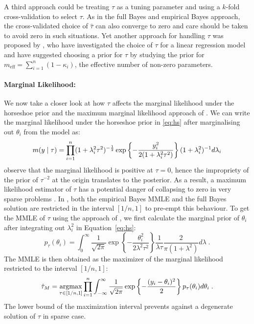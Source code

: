 \documentclass[11pt]{article}
\begin{document}
A third approach could be treating $\tau$ as a tuning parameter and using a
$k$-fold cross-validation to select $\tau$.  As in the full Bayes and empirical
Bayes approach, the cross-validated choice of $\hat{\tau}$ can also converge to
zero and care should be taken to avoid zero in such situations. Yet another
approach for handling $\tau$ was proposed by \citet{piironen2016hyperprior},
who have investigated the choice of $\tau$ for a linear regression model and
have suggested choosing a prior for $\tau$ by studying the prior for
$m_{\text{eff}} = \sum_{i=1}^{n} (1-\kappa_i)$, the effective number of
non-zero parameters. 


\paragraph{Marginal Likelihood: } We now take a closer look at how $\tau$
affects the marginal likelihood under the horseshoe prior and the maximum
marginal likelihood approach of \cite{van2017adaptive}. 
We can write the marginal likelihood under the horseshoe prior in \eqref{eq:hs}
after marginalising out $\theta_i$ from the model as:
\begin{equation}
  m(y \mid \tau) = \prod_{i=1}^{n} (1+\lambda_i^2 \tau^2)^{-\frac{1}{2}} \exp \left
  \{ - \frac{y_i^2}{2(1+\lambda_i^2 \tau^2)} \right \}  (1+\lambda_i^2)^{-1} d
  \lambda_i 
\end{equation}
\citet{tiao1965bayesian} observe that the marginal likelihood is positive at 
$\tau = 0$, hence the impropriety of the prior of $\tau^{-2}$ at the origin
translates to the posterior. As a result, a maximum likelihood estimator of
$\tau$ has a potential danger of collapsing to zero in very sparse problems
\citep{polson2010shrink, datta2013asymptotic}. In \cite{van2017adaptive}, 
both the empirical Bayes MMLE and the full Bayes solution are
restricted in the interval $[1/n,1]$ to pre-empt this behaviour. To get the
MMLE of $\tau$ using the approach of \cite{van2017adaptive}, we first calculate the
marginal prior of $\theta_i$ after integrating out $\lambda_i^2$ in 
Equation~\eqref{eq:hs}:
\begin{equation}
  p_{\tau}(\theta_i) = \int_{0}^{\infty} \frac{1}{\sqrt{2 \pi}} \exp \left\{ -
  \frac{\theta_i^2}{2\lambda^2 \tau^2} \right\} \frac{1}{\lambda \tau}
  \frac{2}{\pi(1+\lambda^2)} d\lambda
  \;.
\end{equation}
The MMLE is then obtained as the maximizer of the marginal likelihood
restricted to the interval $[1/n,1]$: 
\begin{equation}
  \hat{\tau}_M = \argmax_{\tau \in [1/n,1]} \prod_{i=1}^{n}
  \int_{-\infty}^{\infty} \frac{1}{\sqrt{2 \pi}} \exp \left\{ - \frac{(y_i
  -\theta_i)^2}{2} \right\} p_{\tau}(\theta_i) d\theta_i
  \;.
\end{equation}
The lower bound of the maximization interval prevents against a degenerate
solution of $\tau$ in sparse case. 
\end{document}
